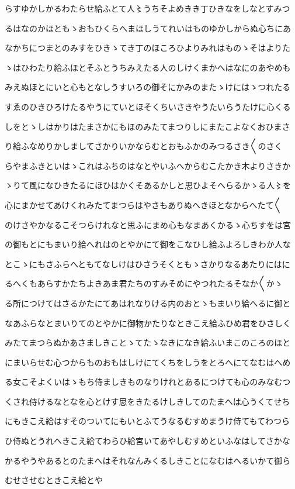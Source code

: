 \documentclass[a4paper,11pt,landscape]{ltjtarticle}
\begin{document}
\par\medskip
らすゆかしかるわたらせ給ふとて人〻うちそよめきき丁ひきなをしなとすみつ
\par\medskip
るはなのかほともゝおもひくらへまほしうてれいはものゆかしからぬ心ちにあ
\par\medskip
なかちにつまとのみすをひきゝてき丁のほころひよりみれはものゝそはよりた
\par\medskip
ゝはひわたり給ふほとそふとうちみえたる人のしけくまかへはなにのあやめも
\par\medskip
みえぬほとにいと心もとなしうすいろの御そにかみのまたゝけにはゝつれたる
\par\medskip
すゑのひきひろけたるやうにていとほそくちいさきやうたいらうたけに心くる
\par\medskip
しをとゝしはかりはたまさかにもほのみたてまつりしにまたこよなくおひまさ
\par\medskip
り給ふなめりかしましてさかりいかならむとおもふかのみつるさき〱のさく
\par\medskip
らやまふきといはゝこれはふちのはなとやいふへからむこたかき木よりさきか
\par\medskip
ゝりて風になひきたるにほひはかくそあるかしと思ひよそへらるかゝる人〻を
\par\medskip
心にまかせてあけくれみたてまつらはやさもありぬへきほとなからへたて〱
\par\medskip
のけさやかなるこそつらけれなと思ふにまめ心もなまあくかるゝ心ちすをは宮
\par\medskip
の御もとにもまいり給へれはのとやかにて御をこなひし給ふよろしきわか人な
\par\medskip
とこゝにもさふらへともてなしけはひさうそくともゝさかりなるあたりにはに
\par\medskip
るへくもあらすかたちよきあま君たちのすみそめにやつれたるそなか〱かゝ
\par\medskip
る所につけてはさるかたにてあはれなりける内のおとゝもまいり給へるに御と
\par\medskip
なあふらなとまいりてのとやかに御物かたりなときこえ給ふひめ君をひさしく
\par\medskip
みたてまつらぬかあさましきことゝてたゝなきになき給ふいまこのころのほと
\par\medskip
にまいらせむ心つからものおもはしけにてくちをしうをとろへにてなむはへめ
\par\medskip
る女こそよくいはゝもち侍ましきものなりけれとあるにつけても心のみなむつ
\par\medskip
くされ侍けるなとなを心とけす思をきたるけしきしてのたまへは心うくてせち
\par\medskip
にもきこえ給はすそのついてにもいとふてうなるむすめまうけ侍てもてわつら
\par\medskip
ひ侍ぬとうれへきこえ給てわらひ給宮いてあやしむすめといふなはしてさかな
\par\medskip
かるやうやあるとのたまへはそれなんみくるしきことになむはへるいかて御ら
\par\medskip
むせさせむときこえ給とや
\par\medskip
\end{document}
